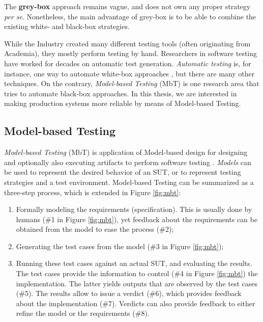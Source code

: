 The \textbf{grey-box} approach remains vague, and does not own
any proper strategy \emph{per se}. Nonetheless, the main
advantage of grey-box is to be able to combine the existing
white- and black-box strategies.

While the Industry created many different testing tools (often
originating from Academia), they mostly perform testing by hand.
Researchers in software testing have worked for decades on
automatic test generation. \emph{Automatic testing}  is, for
instance, one way to automate white-box approaches \cite{pex},
but there are many other techniques. On the contrary,
\emph{Model-based Testing} (MbT) \cite{Jorgensen:1995:STC:526521}
is one research area that tries to automate black-box approaches.
In this thesis, we are interested in making production systems
more reliable by means of Model-based Testing.

\subsection{Model-based Testing}
\label{sec:related:testing:mbt}

\textit{Model-based Testing} (MbT) is application of Model-based
design for designing and optionally also executing artifacts to
perform software testing \cite{Jorgensen:1995:STC:526521}.
\emph{Models} can be used to represent the desired behavior of an
SUT, or to represent testing strategies and a test environment.
Model-based Testing can be summarized as a three-step process,
which is extended in Figure \ref{fig:mbt}:

\begin{enumerate}
    \item Formally modeling the requirements (specification).
        This is usually done by humans (\#1 in Figure
        \ref{fig:mbt}), yet feedback about the requirements can
        be obtained from the model to ease the process (\#2);

    \item Generating the test cases from the model (\#3 in Figure
        \ref{fig:mbt});

    \item Running these test cases against an actual SUT, and
        evaluating the results. The test cases provide the
        information to control (\#4 in Figure \ref{fig:mbt}) the
        implementation. The latter yields outputs that are
        observed by the test cases (\#5).  The results allow to
        issue a verdict (\#6), which provides feedback about the
        implementation (\#7). Verdicts can also provide feedback
        to either refine the model or the requirements (\#8).
\end{enumerate}


